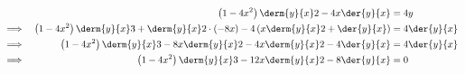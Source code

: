 \documentclass{jhwhw}
\begin{document}
        \begin{alignat*}{2}
            && \left(1-4x^2\right)\derm{y}{x}2 -4x \der{y}{x} &= 4y\\
            \implies&&\left(1 - 4x^2\right) \derm{y}{x}3 + \derm{y}{x}2 \cdot (-8x) - 4\left(x  \derm{y}{x}2 + \der{y}{x} \right) &= 4\der{y}{x}\\
            \implies&&\left(1 - 4x^2\right) \derm{y}{x}3 -8x \derm{y}{x}2 - 4x  \derm{y}{x}2 - 4\der{y}{x} &= 4\der{y}{x}\\
            \implies&&\left(1 - 4x^2\right) \derm{y}{x}3 -12x \derm{y}{x}2 - 8\der{y}{x} &= 0
        \end{alignat*}

\end{document}
